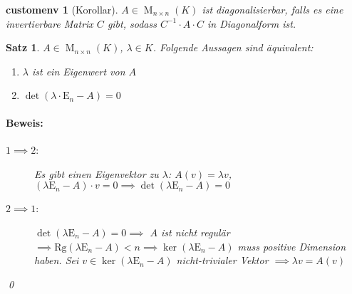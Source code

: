 \documentclass{report}
\newcommand{\lb}{\lambda}
\DeclareMathOperator{\MM}{M}
\newcommand{\En}{\mathrm{E}_n}
\theoremstyle{customrem}
\theoremstyle{customdef}
\newtheorem*{satz*}{Satz} %
\renewenvironment{proof}{\paragraph{Beweis: }}{\qed}
\theoremstyle{customenv}
\newtheorem*{customenv}{customenv} %
\begin{document}
	\begin{customenv}[Korollar]
		\(A\in\MM_{n\times n}(K)\) ist diagonalisierbar, falls es eine invertierbare Matrix \(C\) gibt, sodass \(C^{-1}\cdot A\cdot C\) in Diagonalform ist.
	\end{customenv}
	
	\begin{satz*}
		\(A\in\MM_{n\times n}(K)\), \(\lb\in K\). Folgende Aussagen sind äquivalent:
		\begin{enumerate}
			\item \(\lb\) ist ein Eigenwert von \(A\)
			\item \(\det(\lb\cdot\En-A)=0\)
		\end{enumerate}
	
		\begin{proof}
			\begin{description}
				\item[\(1\implies 2\)\normalfont:] Es gibt einen Eigenvektor zu \(\lb\): \(A(v)=\lb v\), \((\lb\En-A)\cdot v=0 \implies \det(\lb\En-A)=0\)
				\item[\(2\implies 1\)\normalfont:] \(\det(\lb\En-A) = 0\implies\) \(A\) ist nicht regulär \(\implies \mathrm{Rg}(\lb\En-A)<n \implies\ker(\lb\En-A)\) muss positive Dimension haben. Sei \(v\in\ker(\lb\En-A)\) nicht-trivialer Vektor \(\implies \lb v=A(v)\)
			\end{description}
		\end{proof}
	\end{satz*}
	
\end{document}
